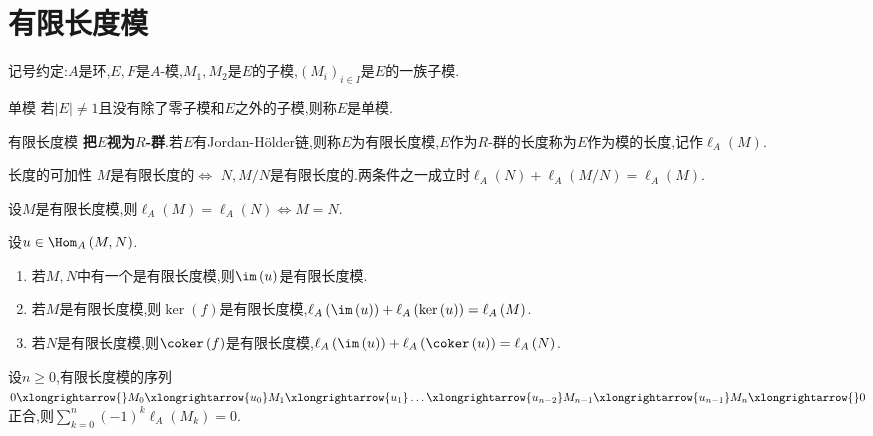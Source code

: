 \section{有限长度模}

记号约定:$A$是环,$E,F$是$A$-模,$M_{1},M_{2}$是$E$的子模,$\left(M_{i}\right)_{i\in I}$是$E$的一族子模.

\begin{definition}{单模}{}
	若$\left|E\right|\neq 1$且没有除了零子模和$E$之外的子模,则称$E$是单模.
\end{definition}

\begin{definition}{有限长度模}{}
	\textbf{把$E$视为$R$-群}.若$E$有Jordan-H\"older链,则称$E$为有限长度模,$E$作为$R$-群的长度称为$E$作为模的长度,记作$\ell_{A}\left(M\right)$.
\end{definition}

\begin{proposition}{长度的可加性}{}
	$M$是有限长度的$\iff$ $N,M/N$是有限长度的.两条件之一成立时$\ell_{A}\left(N\right)+\ell_{A}\left(M/N\right)=\ell_{A}\left(M\right)$.
\end{proposition}

\begin{corollary}{}{}
	设$M$是有限长度模,则$\ell_{A}\left(M\right)=\ell_{A}\left(N\right)\iff M=N$.
\end{corollary}

\begin{corollary}{}{}
	设$u\in\Hom_{A}\left(M,N\right)$.
	\begin{enumerate}
		\item 若$M,N$中有一个是有限长度模,则$\im\left(u\right)$是有限长度模.
		\item 若$M$是有限长度模,则$\ker\left(f\right)$是有限长度模,$\ell_{A}\left(\im\left(u\right)\right)+\ell_{A}\left(\ker\left(u\right)\right)=\ell_{A}\left(M\right)$.
		\item 若$N$是有限长度模,则$\coker\left(f\right)$是有限长度模,$\ell_{A}\left(\im\left(u\right)\right)+\ell_{A}\left(\coker\left(u\right)\right)=\ell_{A}\left(N\right)$.
	\end{enumerate}
\end{corollary}

\begin{corollary}{}{}
	设$n\geq 0$,有限长度模的序列$0\xlongrightarrow{}M_{0}\xlongrightarrow{u_{0}}M_{1}\xlongrightarrow{u_{1}}\ldots\xlongrightarrow{u_{n-2}}M_{n-1}\xlongrightarrow{u_{n-1}}M_{n}\xlongrightarrow{}0$正合,则$\sum\limits_{k=0}^{n}\left(-1\right)^{k}\ell_{A}\left(M_{k}\right)=0$.
\end{corollary}

